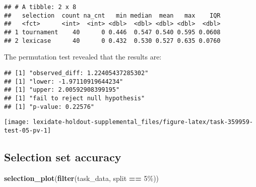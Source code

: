 \documentclass[
]{book}
\newenvironment{Shaded}{\begin{snugshade}}{\end{snugshade}}
\newcommand{\AttributeTok}[1]{\textcolor[rgb]{0.13,0.29,0.53}{#1}}
\newcommand{\DecValTok}[1]{\textcolor[rgb]{0.00,0.00,0.81}{#1}}
\newcommand{\FunctionTok}[1]{\textcolor[rgb]{0.13,0.29,0.53}{\textbf{#1}}}
\newcommand{\NormalTok}[1]{#1}
\newcommand{\OtherTok}[1]{\textcolor[rgb]{0.56,0.35,0.01}{#1}}
\newcommand{\SpecialCharTok}[1]{\textcolor[rgb]{0.81,0.36,0.00}{\textbf{#1}}}
\newcommand{\StringTok}[1]{\textcolor[rgb]{0.31,0.60,0.02}{#1}}
\begin{document}
\begin{verbatim}
## # A tibble: 2 x 8
##   selection  count na_cnt   min median  mean   max    IQR
##   <fct>      <int>  <int> <dbl>  <dbl> <dbl> <dbl>  <dbl>
## 1 tournament    40      0 0.446  0.547 0.540 0.595 0.0608
## 2 lexicase      40      0 0.432  0.530 0.527 0.635 0.0760
\end{verbatim}

The permutation test revealed that the results are:

\begin{Shaded}
\end{Shaded}

\begin{verbatim}
## [1] "observed_diff: 1.22405437285302"
## [1] "lower: -1.97110919644234"
## [1] "upper: 2.00592908399195"
## [1] "fail to reject null hypothesis"
## [1] "p-value: 0.22576"
\end{verbatim}

\texttt{[image: lexidate-holdout-supplemental\_files/figure-latex/task-359959-test-05-pv-1]}

\hypertarget{selection-set-accuracy-35}{%
\subsection{Selection set accuracy}\label{selection-set-accuracy-35}}

\begin{Shaded}
\begin{Highlighting}[]
\FunctionTok{selection\_plot}\NormalTok{(}\FunctionTok{filter}\NormalTok{(task\_data, split }\SpecialCharTok{==} \StringTok{\textquotesingle{}5\%\textquotesingle{}}\NormalTok{))}
\end{Highlighting}
\end{Shaded}
\end{document}
